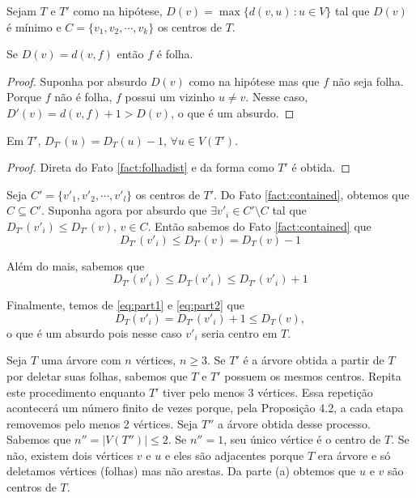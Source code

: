 
 Sejam $T$ e $T'$ como na hipótese, $D(v) = \max\{d(v,u) \, : u \in V\}$
tal que $D(v)$ é mínimo e $C = \{v_1, v_2, \cdots, v_k\}$ os centros de $T$.

\begin{fact}
\label{fact:folhadist}
Se $D(v) = d(v, f)$ então $f$ é folha.
\end{fact}

\begin{proof} Suponha por absurdo $D(v)$ como na hipótese mas que $f$ não seja
folha. Porque $f$ não é folha, $f$ possui um vizinho $u \ne v$. Nesse caso,
$D'(v) = d(v, f) + 1 > D(v)$, o que é um absurdo.
\end{proof}

\begin{fact}
\label{fact:contained}
Em $T'$, $D_{T'}(u) = D_T(u) - 1$, $\forall u \in V(T')$.
\end{fact}

\begin{proof} Direta do Fato \ref{fact:folhadist} e da forma como $T'$ é obtida.
\end{proof}

Seja $C' = \{v'_1, v'_2, \cdots, v'_l\}$ os centros de $T'$. Do Fato
\ref{fact:contained}, obtemos que $C \subseteq C'$. Suponha agora por absurdo que
$\exists v'_i \in C' \setminus C$ tal que $D_{T'}(v'_i) \le D_{T'}(v)$, $v \in C$.
Então sabemos do Fato \ref{fact:contained} que
\begin{equation}
\label{eq:part1}
D_{T'}(v'_i) \le D_{T'}(v) = D_T(v) - 1
\end{equation}

Além do mais, sabemos que
\begin{equation}
\label{eq:part2}
D_{T'}(v'_i) \le D_T(v'_i) \le D_{T'}(v'_i) + 1
\end{equation}

Finalmente, temos de \eqref{eq:part1} e \eqref{eq:part2} que
\[D_T(v'_i) = D_{T'}(v'_i) + 1 \le D_T(v),\] o que é um absurdo pois nesse caso
$v'_i$ seria centro em $T$.

Seja $T$ uma árvore com $n$ vértices, $n \ge 3$. Se $T'$ é a árvore obtida a
partir de $T$ por deletar suas folhas, sabemos que $T$ e $T'$ possuem os mesmos
centros. Repita este procedimento enquanto $T'$ tiver pelo menos 3 vértices.
Essa repetição acontecerá um número finito de vezes porque, pela Proposição
4.2, a cada etapa removemos pelo menos 2 vértices. Seja $T''$ a árvore obtida
desse processo. Sabemos que $n'' = |V(T'')| \le 2$. Se $n'' = 1$, seu único
vértice é o centro de $T$. Se não, existem dois vértices $v$ e $u$ e eles são
adjacentes porque $T$ era árvore e só deletamos vértices (folhas) mas não
arestas. Da parte (a) obtemos que $u$ e $v$ são centros de $T$.
\fimprova

